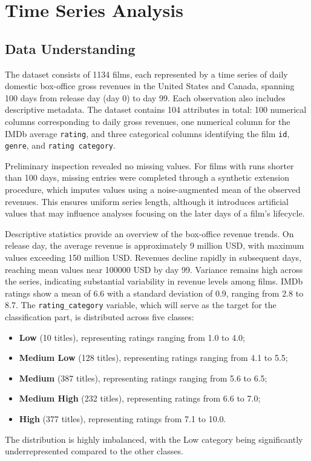 \section{Time Series Analysis}

\subsection{Data Understanding}

The dataset consists of 1134 films, each represented by a time series of daily domestic 
box-office gross revenues in the United States and Canada, spanning 100 days from release day (day 0) 
to day 99. Each observation also includes descriptive metadata. The dataset contains 104 attributes in 
total: 100 numerical columns corresponding to daily gross revenues, one numerical column for the IMDb average \texttt{rating}, 
and three categorical columns identifying the film \texttt{id}, \texttt{genre}, and \texttt{rating category}.

Preliminary inspection revealed no missing values. For films with runs shorter than 100 days, 
missing entries were completed through a synthetic extension procedure, which imputes values using a noise-augmented mean 
of the observed revenues. This ensures uniform series length, although it introduces artificial values that may influence 
analyses focusing on the later days of a film's lifecycle.

Descriptive statistics provide an overview of the box-office revenue trends. 
On release day, the average revenue is approximately 9 million USD, with maximum values exceeding 150 million USD. 
Revenues decline rapidly in subsequent days, reaching mean values near 100000 USD by day 99. 
Variance remains high across the series, indicating substantial variability in revenue levels among films.
IMDb ratings show a mean of 6.6 with a standard deviation of 0.9, ranging from 2.8 to 8.7.
The \texttt{rating\_category} variable, which will serve as the target for the classification part, 
is distributed across five classes: 
\begin{itemize}
    \item \textbf{Low} (10 titles), representing ratings ranging from
    1.0 to 4.0;
    \item \textbf{Medium Low} (128 titles), representing ratings ranging from 4.1 to 5.5;
    \item \textbf{Medium} (387 titles), representing ratings ranging from 5.6 to 6.5;
    \item \textbf{Medium High} (232 titles), representing ratings from 6.6 to 7.0;
    \item \textbf{High} (377 titles), representing ratings from 7.1 to 10.0.
\end{itemize}
The distribution is highly imbalanced, with the Low category being significantly underrepresented compared to the other classes.


